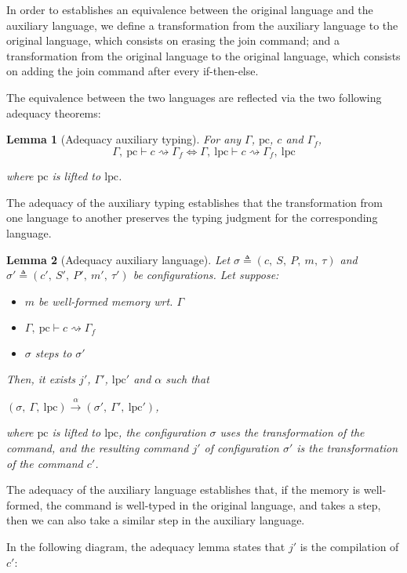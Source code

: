 \documentclass[10pt]{article}
\newcommand{\pc}{\mathrm{pc}}
\newcommand{\lpc}{\mathrm{lpc}}
\newcommand{\ctx}{\Gamma}
\newcommand{\conf}{\sigma}
\newcommand{\typing}[4]{ #1,~#2 \vdash #3 \rightsquigarrow #4}
\newcommand{\typingaux}[5]{ #1,~#2 \vdash #3 \rightsquigarrow #4,~#5}
\newcommand{\execaux}[7] { (#1,~#2,~#3) \xrightarrow{#4} (#5,~#6,~#7) }
\newtheorem{lemma}{Lemma}
\begin{document}
In order to establishes an equivalence between the original language and the auxiliary language, we
define a transformation from the auxiliary language to the original language, which consists on
erasing the join command; and a transformation from the original language to the original language,
which consists on adding the join command after every if-then-else.

The equivalence between the two languages are reflected via the two following adequacy theorems:

\begin{lemma}[Adequacy auxiliary typing]
  For any $\ctx$, $\pc$, $c$ and $\ctx_{f}$,
  \[
  \typing{\ctx}{\pc}{c}{\ctx_{f}}
  \Leftrightarrow
    \typingaux{\ctx}{\lpc}{c}{\ctx_{f}}{\lpc}
  \]

  where $\pc$ is lifted to $\lpc$.
\end{lemma}

The adequacy of the auxiliary typing establishes that the transformation from one language to
another preserves the typing judgment for the corresponding language.

\begin{lemma}[Adequacy auxiliary language]
  Let $\conf \triangleq (c,~S,~P,~m,~\tau)$ and
  $\conf' \triangleq (c',~S',~P',~m',~\tau')$ be configurations.
  Let suppose:
  \begin{itemize}
    \item $m$ be well-formed memory wrt. $\ctx$
    \item $\typing{\ctx}{\pc}{c}{\ctx_{f}}$
    \item $\conf$ steps to $\conf'$
  \end{itemize}

  Then, it exists $j'$, $\ctx'$, $\lpc'$ and $\alpha$ such that

  \( \execaux{\conf}{\ctx}{\lpc}{\alpha}{\conf'}{\ctx'}{\lpc'} \),

  where $\pc$ is lifted to $\lpc$, the configuration $\conf$ uses the transformation of the command,
  and the resulting command $j'$ of configuration $\conf'$ is the transformation of the command $c'$.
\end{lemma}

The adequacy of the auxiliary language establishes that, if the memory is well-formed, the
command is well-typed in the original language, and takes a step, then we can also take a similar
step in the auxiliary language.

In the following diagram, the adequacy lemma states that $j'$ is the compilation of $c'$:
\end{document}
